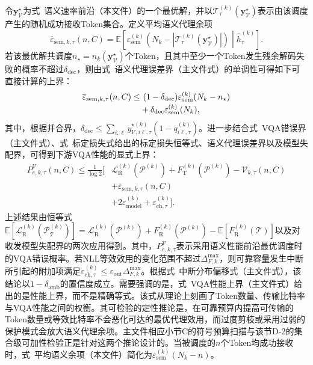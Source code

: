 \documentclass[journal]{IEEEtran}
\begin{document}
令$\bm y_{\mathcal V}^{\star}$为式~语义速率前沿（本文件）的一个最优解，并以$\mathcal T_{\tau}^{(k)}(\bm y_{\mathcal V}^{\star})$表示由该调度产生的随机成功接收Token集合。定义平均语义代理余项
\begin{equation}
\overline\varepsilon_{\mathrm{sem},k,\tau}(n,C)
=\mathbb E\!\left[
\varepsilon_{\mathrm{sem}}^{(k)}
\!\left(N_k-|\mathcal T_{\tau}^{(k)}(\bm y_{\mathcal V}^{\star})|\right)
\middle|\widehat h_{\tau}^{(k)}\right].
\label{eq:average_semantic_remainder}
\end{equation}
若该最优解共调度$n_{\star}=n_k(\bm y_{\mathcal V}^{\star})$个Token，且其中至少一个Token发生残余解码失败的概率不超过$\delta_{\mathrm{dec}}$，则由式~语义代理误差界（主文件式）的单调性可得如下可直接计算的上界：
\begin{align}
\overline\varepsilon_{\mathrm{sem},k,\tau}(n,C)
\leq&~(1-\delta_{\mathrm{dec}})
\varepsilon_{\mathrm{sem}}^{(k)}(N_k-n_{\star})
\notag\\[-0.2em]
&+\delta_{\mathrm{dec}}\varepsilon_{\mathrm{sem}}^{(k)}(N_k),
\label{eq:average_semantic_remainder_bound}
\end{align}
其中，根据并合界，$\delta_{\mathrm{dec}}\leq\sum_{i,\ell}y_{\mathcal V,i\ell,\tau}^{\star(k)}(1-q_{i\ell,\tau}^{(k)})$。进一步结合式~VQA错误界（主文件式）、式~标定损失式给出的标定损失恒等式、语义代理误差界以及模型失配界，可得到下游VQA性能的显式上界：
\begin{equation}
\begin{split}
P_{e,k,\tau}^{\mathcal V}(n,C)
\leq\frac{1}{\log 2}\big[&\mathcal L_{\mathrm R}^{(k)}(\mathcal P^{(k)})
+F_{\mathrm T}^{(k)}(\mathcal P^{(k)})
-\mathcal V_{k,\tau}(n,C)\\
&+\overline\varepsilon_{\mathrm{sem},k,\tau}(n,C)\\
&+2\varepsilon_{\mathrm{model}}^{(k)}
+\varepsilon_{\mathrm{ch},\tau}^{(k)}\big].
\end{split}
\label{eq:rate_retention_vqa_boundary}
\end{equation}
上述结果由恒等式$\mathbb E[\mathcal L_{\mathrm R}^{(k)}(\mathcal P_{\mathcal T}^{(k)})]=\mathcal L_{\mathrm R}^{(k)}(\mathcal P^{(k)})+F_{\mathrm R}^{(k)}(\mathcal P^{(k)})-\mathbb E[F_{\mathrm R}^{(k)}(\mathcal T)]$以及对收发模型失配界的两次应用得到。其中，$P_{e,k,\tau}^{\mathcal V}$表示采用语义性能前沿最优调度时的VQA错误概率。若NLL等效效用的变化范围不超过$\Delta_{F,k}^{\max}$，则可靠容量发生中断所引起的附加项满足$\varepsilon_{\mathrm{ch},\tau}^{(k)}\leq\varepsilon_{\mathrm{out}}\Delta_{F,k}^{\max}$。根据式~中断分布偏移式（主文件式），该结论以$1-\delta_{\mathrm{amb}}$的置信度成立。需要强调的是，式~VQA性能上界（主文件式）给出的是性能上界，而不是精确等式。该式从理论上刻画了Token数量、传输比特率与VQA性能之间的权衡。其可检验的定性推论是，在可靠预算内提高可传输的Token数量或等效比特率不会恶化可达的最优代理效用，而过度剪枝或采用过弱的保护模式会放大语义代理余项。主文件相应小节C的符号预算扫描与该节D-2的集合级可加性检验正是针对这两个推论设计的。当被调度的$n$个Token均成功接收时，式~平均语义余项（本文件）简化为$\varepsilon_{\mathrm{sem}}^{(k)}(N_k-n)$。
\end{document}
